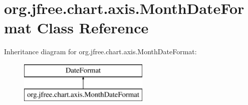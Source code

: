 \hypertarget{classorg_1_1jfree_1_1chart_1_1axis_1_1_month_date_format}{}\section{org.\+jfree.\+chart.\+axis.\+Month\+Date\+Format Class Reference}
\label{classorg_1_1jfree_1_1chart_1_1axis_1_1_month_date_format}
Inheritance diagram for org.\+jfree.\+chart.\+axis.\+Month\+Date\+Format\+:\begin{figure}[H]
\begin{center}
\leavevmode
\includegraphics[height=2.000000cm]{classorg_1_1jfree_1_1chart_1_1axis_1_1_month_date_format}
\end{center}
\end{figure}
